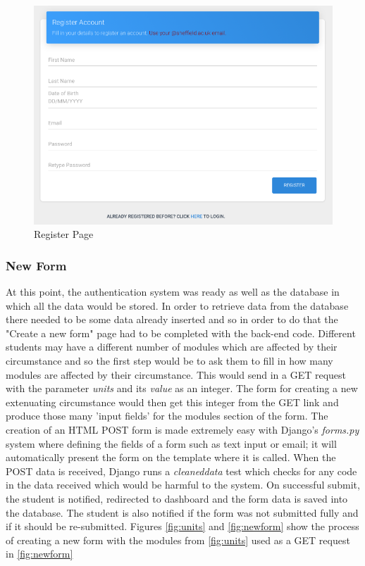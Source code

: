 \documentclass[../main.tex]{subfiles}
\begin{document}
\begin{figure}[H]
	\begin{center}
        \includegraphics[scale=1]
        {images/register.png}
        \caption{\label{fig:register} Register Page}
     \end{center} 
      \end{figure}
 

\subsubsection{New Form}
At this point, the authentication system was ready as well as the database in which all the data would be stored. In order to retrieve data from the database there needed to be some data already inserted and so in order to do that the "Create a new form" page had to be completed with the back-end code. Different students may have a different number of modules which are affected by their circumstance and so the first step would be to ask them to fill in how many modules are affected by their circumstance. This would send in a GET request with the parameter \textit{units} and its \textit{value} as an integer. The form for creating a new extenuating circumstance would then get this integer from the GET link and produce those many 'input fields' for the modules section of the form. The creation of an HTML POST form is made extremely easy with Django's \textit{forms.py} system where defining the fields of a form such as text input or email; it will automatically present the form on the template where it is called. When the POST data is received, Django runs a \textit{cleaneddata} test which checks for any code in the data received which would be harmful to the system. On successful submit, the student is notified, redirected to dashboard and the form data is saved into the database. The student is also notified if the form was not submitted fully and if it should be re-submitted. Figures \ref{fig:units} and \ref{fig:newform} show the process of creating a new form with the modules from \ref{fig:units} used as a GET request in \ref{fig:newform}
\end{document}

